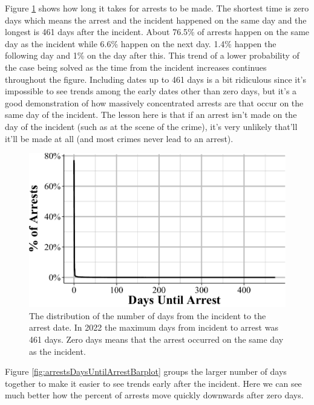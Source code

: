 \documentclass[
  12pt,
  openany]{book}
\begin{document}
Figure \ref{fig:arrestsDaysUntilArrest} shows how long it takes for arrests to be made. The shortest time is zero days which means the arrest and the incident happened on the same day and the longest is 461 days after the incident. About 76.5\% of arrests happen on the same day as the incident while 6.6\% happen on the next day. 1.4\% happen the following day and 1\% on the day after this. This trend of a lower probability of the case being solved as the time from the incident increases continues throughout the figure. Including dates up to 461 days is a bit ridiculous since it's impossible to see trends among the early dates other than zero days, but it's a good demonstration of how massively concentrated arrests are that occur on the same day of the incident. The lesson here is that if an arrest isn't made on the day of the incident (such as at the scene of the crime), it's very unlikely that'll it'll be made at all (and most crimes never lead to an arrest).

\begin{figure}

{\centering \includegraphics[width=0.9\linewidth]{16_nibrs_arrestee_files/figure-latex/arrestsDaysUntilArrest-1} 

}

\caption{The distribution of the number of days from the incident to the arrest date. In 2022 the maximum days from incident to arrest was 461 days. Zero days means that the arrest occurred on the same day as the incident.}\label{fig:arrestsDaysUntilArrest}
\end{figure}

Figure \ref{fig:arrestsDaysUntilArrestBarplot} groups the larger number of days together to make it easier to see trends early after the incident. Here we can see much better how the percent of arrests move quickly downwards after zero days.
\end{document}
